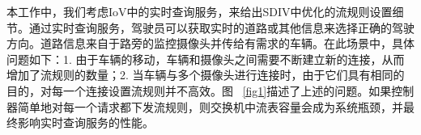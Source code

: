 
本工作中，我们考虑IoV中的实时查询服务，来给出SDIV中优化的流规则设置细节。通过实时查询服务，驾驶员可以获取实时的道路或其他信息来选择正确的驾驶方向。道路信息来自于路旁的监控摄像头并传给有需求的车辆。在此场景中，具体问题如下：1. 由于车辆的移动，车辆和摄像头之间需要不断建立新的连接，从而增加了流规则的数量；2. 当车辆与多个摄像头进行连接时，由于它们具有相同的目的，对每一个连接设置流规则并不高效。图~ \ref{fig1}描述了上述的问题。如果控制器简单地对每一个请求都下发流规则，则交换机中流表容量会成为系统瓶颈，并最终影响实时查询服务的性能。


